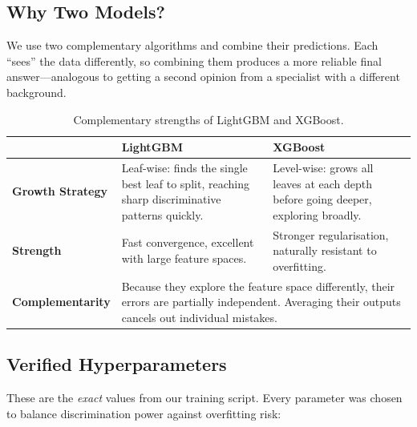 \documentclass[11pt, a4paper]{article}
\begin{document}
\subsection{Why Two Models?}

We use two complementary algorithms and combine their predictions. Each ``sees'' the data
differently, so combining them produces a more reliable final answer---analogous to getting
a second opinion from a specialist with a different background.

\begin{table}[H]
\centering\small
\caption{Complementary strengths of LightGBM and XGBoost.}
\begin{tabular}{@{}lp{5.5cm}p{5.5cm}@{}}
\toprule
& \textbf{LightGBM} & \textbf{XGBoost} \\
\midrule
\textbf{Growth Strategy} &
    Leaf-wise: finds the single best leaf to split, reaching sharp discriminative patterns
    quickly. &
    Level-wise: grows all leaves at each depth before going deeper, exploring broadly. \\[6pt]
\textbf{Strength} &
    Fast convergence, excellent with large feature spaces. &
    Stronger regularisation, naturally resistant to overfitting. \\[6pt]
\textbf{Complementarity} &
    \multicolumn{2}{p{11cm}}{Because they explore the feature space differently, their errors
    are partially independent. Averaging their outputs cancels out individual mistakes.} \\
\bottomrule
\end{tabular}
\end{table}

\subsection{Verified Hyperparameters}

These are the \emph{exact} values from our training script. Every parameter was chosen to
balance discrimination power against overfitting risk:
\end{document}
